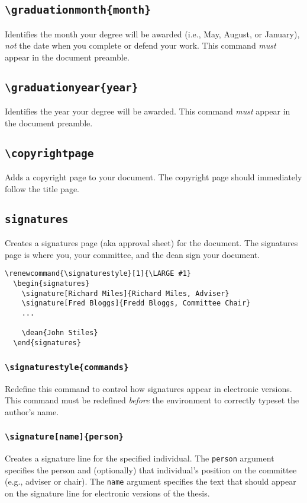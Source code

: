 \documentclass[10pt]{article}
\newcommand{\environment}[1]{\texttt{#1}}
\newcommand{\command}[1]{\texttt{\textbackslash#1}}
\newcommand{\argument}[1]{\texttt{#1}}
\begin{document}
\subsection{\command{graduationmonth\{month\}}}
Identifies the month your degree will be awarded (i.e., May, August, or January), \emph{not} the date when you complete or defend your work.
This command \emph{must} appear in the document preamble.

\subsection{\command{graduationyear\{year\}}}
Identifies the year your degree will be awarded.
This command \emph{must} appear in the document preamble.

\subsection{\command{copyrightpage}}
Adds a copyright page to your document.
The copyright page should immediately follow the title page.

\subsection{\environment{signatures}}
Creates a signatures page (aka approval sheet) for the document.
The signatures page is where you, your committee, and the dean sign your document.

\begin{lstlisting}[gobble=2]
  \renewcommand{\signaturestyle}[1]{\LARGE #1}
  \begin{signatures}
    \signature[Richard Miles]{Richard Miles, Adviser}
    \signature[Fred Bloggs]{Fredd Bloggs, Committee Chair}
    ...
    
    \dean{John Stiles}
  \end{signatures}
\end{lstlisting}

\subsubsection{\command{signaturestyle\{commands\}}}
Redefine this command to control how signatures appear in electronic versions.
This command must be redefined \emph{before} the environment to correctly typeset the author's name.

\subsubsection{\command{signature[name]\{person\}}}
Creates a signature line for the specified individual.
The \argument{person} argument specifies the person and (optionally) that individual's position on the committee (e.g., adviser or chair).
The \argument{name} argument specifies the text that should appear on the signature line for electronic versions of the thesis.
\end{document}
